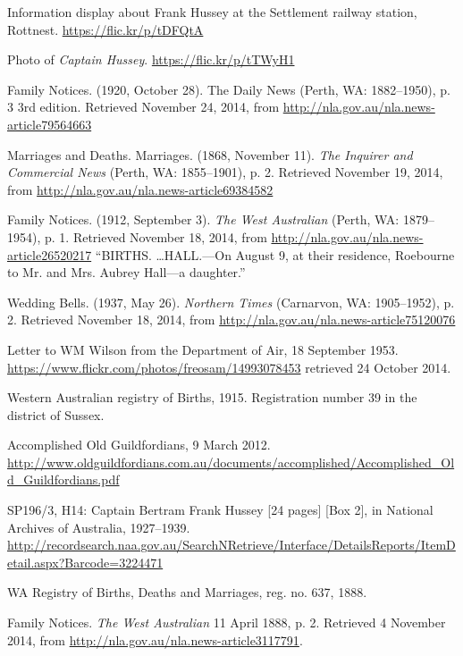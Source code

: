 \begin{thebibliography}{999}
	Information display about Frank Hussey at the Settlement railway station, Rottnest.
	\url{https://flic.kr/p/tDFQtA}

	Photo of \emph{Captain Hussey}. \url{https://flic.kr/p/tTWyH1}

	Family Notices. (1920, October 28). The Daily News (Perth, WA: 1882--1950), p. 3 3rd edition.
	Retrieved November 24, 2014, from \url{http://nla.gov.au/nla.news-article79564663}

	Marriages and Deaths. Marriages. (1868, November 11). \emph{The Inquirer and Commercial News} (Perth, WA: 1855--1901), p. 2.
	Retrieved November 19, 2014, from \url{http://nla.gov.au/nla.news-article69384582}
    
	Family Notices. (1912, September 3). \emph{The West Australian} (Perth, WA: 1879--1954), p. 1.
	Retrieved November 18, 2014, from \url{http://nla.gov.au/nla.news-article26520217}
	``BIRTHS. \dots HALL.---On August 9, at their residence, Roebourne to Mr. and Mrs. Aubrey Hall---a daughter.''

	Wedding Bells. (1937, May 26). \emph{Northern Times} (Carnarvon, WA: 1905--1952), p. 2.
	Retrieved November 18, 2014, from \url{http://nla.gov.au/nla.news-article75120076}

	Letter to WM Wilson from the Department of Air, 18 September 1953.
	\url{https://www.flickr.com/photos/freosam/14993078453} retrieved 24 October 2014.

	Western Australian registry of Births, 1915. Registration number 39 in the district of Sussex.

	Accomplished Old Guildfordians, 9 March 2012.
	\url{http://www.oldguildfordians.com.au/documents/accomplished/Accomplished_Old_Guildfordians.pdf}

	SP196/3, H14: Captain Bertram Frank Hussey [24 pages] [Box 2], in National Archives of Australia, 1927--1939.
	\url{http://recordsearch.naa.gov.au/SearchNRetrieve/Interface/DetailsReports/ItemDetail.aspx?Barcode=3224471}

	WA Registry of Births, Deaths and Marriages, reg. no. 637, 1888.

	Family Notices. \emph{The West Australian} 11 April 1888, p. 2. Retrieved 4 November 2014,
	from \url{http://nla.gov.au/nla.news-article3117791}.


\end{thebibliography}
